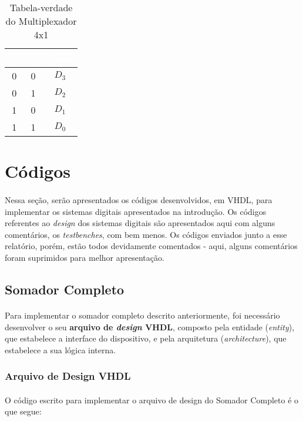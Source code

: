 \documentclass[a4paper,12pt]{article}
\begin{document}
\begin{table}[H]
    \centering
    \begin{tabular}{|c|c|c|}
        \hline
        \rowcolor{black}
        \textcolor{white}{$S_1$} & \textcolor{white}{$S_0$} & \textcolor{white}{Saída} \\ \hline
        0 & 0 & $D_3$ \\ \hline
        \rowcolor{lightgray}
        0 & 1 & $D_2$ \\ \hline
        1 & 0 & $D_1$ \\ \hline
        \rowcolor{lightgray}
        1 & 1 & $D_0$ \\ \hline
    \end{tabular}
    \caption{Tabela-verdade do Multiplexador 4x1}
\end{table}

\section{Códigos}
\paragraph{}
Nessa seção, serão apresentados os códigos desenvolvidos, em VHDL, para implementar os sistemas digitais apresentados na introdução. Os códigos referentes ao \textit{design} dos sistemas digitais são apresentados aqui com alguns comentários, os \textit{testbenches}, com bem menos. Os códigos enviados junto a esse relatório, porém, estão todos devidamente comentados - aqui, alguns comentários foram suprimidos para melhor apresentação.

\subsection{Somador Completo}
\paragraph{}
Para implementar o somador completo descrito anteriormente, foi necessário desenvolver o seu \textbf{arquivo de \textit{design} VHDL}, composto pela entidade (\textit{entity}), que estabelece a interface do dispositivo, e pela arquitetura (\textit{architecture}), que estabelece a sua lógica interna.

\subsubsection{Arquivo de Design VHDL}
\paragraph{}
O código escrito para implementar o arquivo de design do Somador Completo é o que segue:
\end{document}
